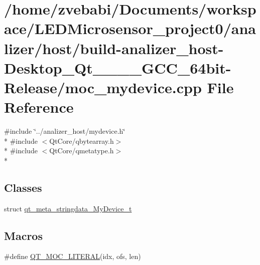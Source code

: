 \hypertarget{build-analizer__host-_desktop___qt__5__9__0___g_c_c__64bit-_release_2moc__mydevice_8cpp}{\section{/home/zvebabi/\+Documents/workspace/\+L\+E\+D\+Microsensor\+\_\+project0/analizer/host/build-\/analizer\+\_\+host-\/\+Desktop\+\_\+\+Qt\+\_\+\_\+\_\+\_\+\+G\+C\+C\+\_\+64bit-\/\+Release/moc\+\_\+mydevice.cpp File Reference}
\label{build-analizer__host-_desktop___qt__5__9__0___g_c_c__64bit-_release_2moc__mydevice_8cpp}
}
{\ttfamily \#include \char`\"{}../analizer\+\_\+host/mydevice.\+h\char`\"{}}\\*
{\ttfamily \#include $<$Qt\+Core/qbytearray.\+h$>$}\\*
{\ttfamily \#include $<$Qt\+Core/qmetatype.\+h$>$}\\*
\subsection*{Classes}
\begin{DoxyCompactItemize}
\item 
struct \hyperlink{structqt__meta__stringdata___my_device__t}{qt\+\_\+meta\+\_\+stringdata\+\_\+\+My\+Device\+\_\+t}
\end{DoxyCompactItemize}
\subsection*{Macros}
\begin{DoxyCompactItemize}
\item 
\#define \hyperlink{build-analizer__host-_desktop___qt__5__9__0___g_c_c__64bit-_release_2moc__mydevice_8cpp_a75bb9482d242cde0a06c9dbdc6b83abe}{Q\+T\+\_\+\+M\+O\+C\+\_\+\+L\+I\+T\+E\+R\+A\+L}(idx, ofs, len)
\end{DoxyCompactItemize}


